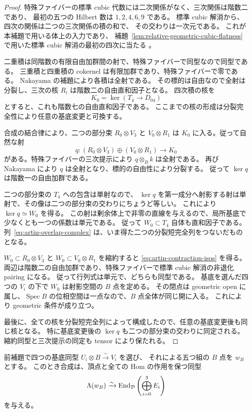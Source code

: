 \begin{proof}
特殊ファイバーの標準 cubic 代数には二次関係がなく、三次関係は階数二であり、
最初の五つの Hilbert 数は $1,2,4,6,9$ である。
標準 cubic 解消から、四次の関係は二つの三次関係の積の和で、
その交わりは一次元である。
これが本補題で用いる体上の入力であり、
補題~\ref{lem:relative-geometric-cubic-flatness} で用いた標準 cubic 解消の最初の四次に当たる
\cite[arXiv v3, Theorems 5.5.7--5.5.10]{VdB2011}。

二重積は同階数の有限自由加群間の射で、特殊ファイバーで同型なので同型である。
三重積と四重積の cokernel は有限加群であり、特殊ファイバーで零である。
Nakayama の補題により各積は全射である。
その標的は自由なので全射は分裂し、三次の核 $R_i$ は階数二の自由直和因子となる。
四次積の核を
\[
 K_0=\ker(T_4\longrightarrow D_{04})
\]
とすると、これも階数七の自由直和因子である。
ここまでの核の形成は分裂完全性により任意の基底変更と可換する。

合成の結合律により、二つの部分束 $R_0\otimes V_3$ と $V_0\otimes R_1$ は
$K_0$ に入る。従って自然な射
\[
 q:(R_0\otimes V_3)\oplus(V_0\otimes R_1)\longrightarrow K_0
\]
がある。特殊ファイバーの三次提示により $q\otimes_Bk$ は全射である。
再び Nakayama により $q$ は全射となり、標的の自由性により分裂する。
従って $\ker q$ は階数一の自由加群である。

二つの部分束の $T_4$ への包含は単射なので、
$\ker q$ を第一成分へ射影する射は単射で、その像は二つの部分束の交わりにちょうど等しい。
これにより $\ker q\simeq W_0$ を得る。
この射は剰余体上で非零の直線を与えるので、局所基底で少なくとも一つの係数は単元である。
従って $W_0\subset T_4$ 自体も直和因子である。
列~\eqref{eq:artin-overlap-complex} は、いま得た二つの分裂短完全列をつないだものとなる。

$W_0\subset R_0\otimes V_3$ と $W_0\subset V_0\otimes R_1$ を縮約すると
\eqref{eq:artin-contraction-isos} を得る。
両辺は階数二の自由加群であり、特殊ファイバーで標準 cubic 解消の非退化 pairing になる。
従って行列式は単元で、どちらも同型である。
基底を選んだ四つの $V_i$ の下で $W_0$ は射影空間の $B$ 点を定める。
その閉点は geometric open に属し、$\operatorname{Spec} B$ の位相空間は一点なので、$B$ 点全体が同じ開に入る。
これにより geometric 条件が成り立つ。

最後に、全ての核を分裂短完全列によって構成したので、任意の基底変更後も同じ核となる。
特に基底変更後の $\ker q$ も二つの部分束の交わりに同定される。
縮約同型と三次提示の同定も tensor により保たれる。
\end{proof}

\begin{corollary}
\label{cor:quintuple-four-window}
前補題で四つの基底同型 $U_i\otimes B\xrightarrow{\sim}V_i$ を選び、
それによる五つ組の $B$ 点を $w_B$ とする。
このとき合成は、頂点と全ての Hom の作用を保つ同型
\[
 \Lambda(w_B)\xrightarrow{\sim}
 \operatorname{End}_{\mathcal D}\left(\bigoplus_{i=0}^3E_i\right)
\]
を与える。
\end{corollary}

